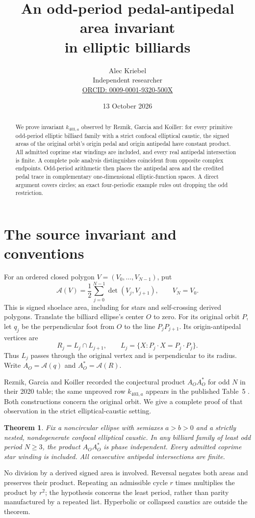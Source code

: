 \documentclass[11pt,letterpaper]{article}
\title{An odd-period pedal-antipedal area invariant\\in elliptic billiards}
\author{Alec Kriebel\\
\small Independent researcher\\
\small\href{https://orcid.org/0009-0001-9320-500X}{ORCID: 0009-0001-9320-500X}}
\date{13 October 2026}
\newtheorem{theorem}{Theorem}
\newcommand{\area}{\mathcal A}
\begin{document}
\maketitle
\begin{abstract}
We prove invariant $k_{403,a}$ observed by Reznik, Garcia and Koiller:
for every primitive odd-period elliptic billiard family with a strict
confocal elliptical caustic, the signed areas of the original orbit's
origin pedal and origin antipedal have constant product. All admitted
coprime star windings are included, and every real antipedal intersection
is finite. A complete pole analysis distinguishes coincident from
opposite complex endpoints. Odd-period arithmetic then places the
antipedal area and the credited pedal trace in complementary
one-dimensional elliptic-function spaces. A direct argument covers
circles; an exact four-periodic example rules out dropping the odd
restriction.
\end{abstract}

\section{The source invariant and conventions}
For an ordered closed polygon $V=(V_0,\ldots,V_{N-1})$, put
\[
 \area(V)=\frac12\sum_{j=0}^{N-1}\det(V_j,V_{j+1}),
 \qquad V_N=V_0.
\]
This is signed shoelace area, including for stars and self-crossing
derived polygons. Translate the billiard ellipse's center $O$ to zero.
For its original orbit $P$, let $q_j$ be the perpendicular foot from
$O$ to the line $P_jP_{j+1}$. Its origin-antipedal vertices are
\[
 R_j=L_j\cap L_{j+1},\qquad
 L_j=\{X:P_j\cdot X=P_j\cdot P_j\}.
\]
Thus $L_j$ passes through the original vertex and is perpendicular to
its radius. Write $A_O=\area(q)$ and $A_O^*=\area(R)$.

Reznik, Garcia and Koiller recorded the conjectural product
$A_OA_O^*$ for odd $N$ in their 2020 table; the same unproved row
$k_{403,a}$ appears in the published Table~5
\cite{source,old}. Both constructions concern the original orbit.
We give a complete proof of that observation in the strict
elliptical-caustic setting.

\begin{theorem}\label{thm:main}
Fix a noncircular ellipse with semiaxes $a>b>0$ and a strictly nested,
nondegenerate confocal elliptical caustic. In any billiard family of
least odd period $N\geq3$, the product $A_OA_O^*$ is phase independent.
Every admitted coprime star winding is included. All consecutive
antipedal intersections are finite.
\end{theorem}
No division by a derived signed area is involved. Reversal negates
both areas and preserves their product. Repeating an admissible cycle
$r$ times multiplies the product by $r^2$; the hypothesis concerns the
least period, rather than parity manufactured by a repeated list.
Hyperbolic or collapsed caustics are outside the theorem.
\end{document}
